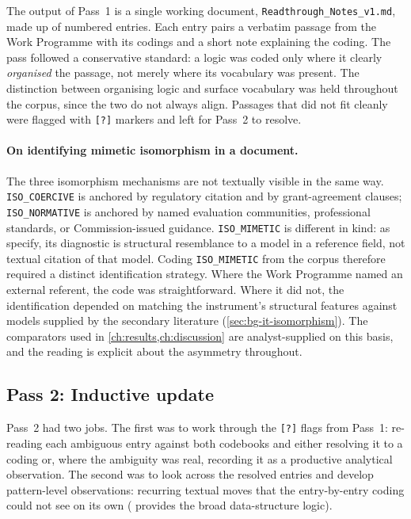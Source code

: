 The output of Pass~1 is a single working document,
\texttt{Readthrough\_Notes\_v1.md}, made up of numbered entries. Each
entry pairs a verbatim passage from the Work Programme with its codings
and a short note explaining the coding. The pass followed a conservative
standard: a logic was coded only where it clearly \emph{organised} the
passage, not merely where its vocabulary was present. The distinction
between organising logic and surface vocabulary was held throughout
the corpus, since the two do not always align. Passages that did not
fit cleanly were flagged with \texttt{[?]} markers and left for Pass~2
to resolve.

\paragraph{On identifying mimetic isomorphism in a document.}
The three isomorphism mechanisms are not textually visible in the same
way. \texttt{ISO\_COERCIVE} is anchored by regulatory citation and by
grant-agreement clauses; \texttt{ISO\_NORMATIVE} is anchored by named
evaluation communities, professional standards, or Commission-issued
guidance. \texttt{ISO\_MIMETIC} is different in kind: as
\textcite{dimaggio1983iron} specify, its diagnostic is structural
resemblance to a model in a reference field, not textual citation of
that model. Coding \texttt{ISO\_MIMETIC} from the corpus therefore
required a distinct identification strategy. Where the Work Programme
named an external referent, the code was straightforward. Where it did
not, the identification depended on matching the instrument's
structural features against models supplied by the secondary
literature (\cref{sec:bg-it-isomorphism}). The comparators used in
\cref{ch:results,ch:discussion} are analyst-supplied on this basis, and
the reading is explicit about the asymmetry throughout.

\subsection{Pass 2: Inductive update}
\label{sec:meth-pass2}

Pass~2 had two jobs. The first was to work through the \texttt{[?]}
flags from Pass~1: re-reading each ambiguous entry against both
codebooks and either resolving it to a coding or, where the ambiguity
was real, recording it as a productive analytical observation. The
second was to look across the resolved entries and develop
pattern-level observations: recurring textual moves that the
entry-by-entry coding could not see on its own
(\textcite{gioia2013seeking} provides the broad data-structure logic).

